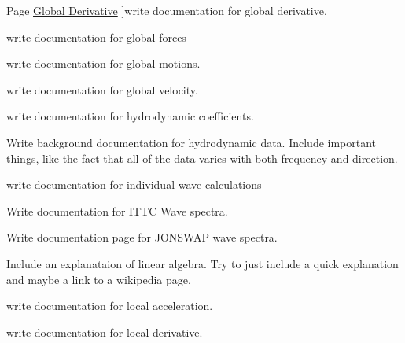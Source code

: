 \begin{DoxyRefList}
\hypertarget{todo__todo000013}{}%
Page \hyperlink{global_derivative}{Global Derivative} ]write documentation for global derivative. 
\item[\label{todo__todo000014}%
\hypertarget{todo__todo000014}{}%
Page \hyperlink{global_force}{Global Forces} ]write documentation for global forces 
\item[\label{todo__todo000015}%
\hypertarget{todo__todo000015}{}%
Page \hyperlink{global_motion}{Global Motion} ]write documentation for global motions. 
\item[\label{todo__todo000016}%
\hypertarget{todo__todo000016}{}%
Page \hyperlink{global_velocity}{Global Velocity} ]write documentation for global velocity. 
\item[\label{todo__todo000046}%
\hypertarget{todo__todo000046}{}%
Page \hyperlink{hydrodynamic_coefficients}{Hydrodynamic Coefficients} ]write documentation for hydrodynamic coefficients. 
\item[\label{todo__todo000040}%
\hypertarget{todo__todo000040}{}%
Page \hyperlink{hydrodynamic_data}{Hydrodynamic Data} ]Write background documentation for hydrodynamic data. Include important things, like the fact that all of the data varies with both frequency and direction. 
\item[\label{todo__todo000048}%
\hypertarget{todo__todo000048}{}%
Page \hyperlink{wave_calculation}{Individual Wave Calculations} ]write documentation for individual wave calculations 
\item[\label{todo__todo000032}%
\hypertarget{todo__todo000032}{}%
Page \hyperlink{ittc_spectra}{I\-T\-T\-C (Bretschneider) Wave Spectra} ]Write documentation for I\-T\-T\-C Wave spectra. 
\item[\label{todo__todo000033}%
\hypertarget{todo__todo000033}{}%
Page \hyperlink{jonswap_spectra}{J\-O\-N\-S\-W\-A\-P Wave Spectra} ]Write documentation page for J\-O\-N\-S\-W\-A\-P wave spectra. 
\item[\label{todo__todo000041}%
\hypertarget{todo__todo000041}{}%
Page \hyperlink{linear_algebra}{Linear Algebra} ]Include an explanataion of linear algebra. Try to just include a quick explanation and maybe a link to a wikipedia page. 
\item[\label{todo__todo000017}%
\hypertarget{todo__todo000017}{}%
Page \hyperlink{local_acceleration}{Local Acceleration} ]write documentation for local acceleration. 
\item[\label{todo__todo000018}%
\hypertarget{todo__todo000018}{}%
Page \hyperlink{local_derivative}{Local Derivative} ]write documentation for local derivative. 

\end{DoxyRefList}
